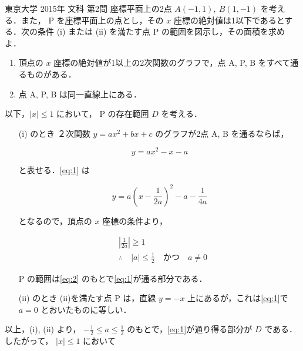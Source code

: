 \documentclass[a4paper]{ltjsarticle}
\begin{document}
\begin{itembox}[l]{東京大学 2015年 文科 第2問}
    座標平面上の2点 $A(-1, 1),\ B(1, -1)$ を考える．また， P を座標平面上の点とし，その $x$ 座標の絶対値は1以下であるとする．次の条件 (i) または (ii) を満たす点 P の範囲を図示し，その面積を求めよ．

    \begin{enumerate}[label=(\roman*)]
        \item 頂点の $x$ 座標の絶対値が1以上の2次関数のグラフで，点 A, P, B をすべて通るものがある．
        \item 点 A, P, B は同一直線上にある．
    \end{enumerate}
\end{itembox}

以下，$|x|\leq 1$ において， P の存在範囲 $D$ を考える．

\begin{itemize}
    \item[(i) のとき] ２次関数 $y=ax^2+bx+c$ のグラフが2点 A, B を通るならば，

        \begin{equation}
            y=ax^2-x-a\label{eq:1}
        \end{equation}

        と表せる．\eqref{eq:1} は

        \begin{equation*}
            y=a(x-\frac{1}{2a})^2-a-\frac{1}{4a}
        \end{equation*}

        となるので，頂点の $x$ 座標の条件より，

        \begin{align}
             & \left|\frac{1}{2a}\right|\geq 1\nonumber                                   \\
             & \therefore\quad |a|\leq \frac{1}{2}\quad\text{かつ}\quad a\neq 0\label{eq:2}
        \end{align}

        P の範囲は\eqref{eq:2} のもとで\eqref{eq:1}が通る部分である．

    \item[(ii) のとき] (ii)を満たす点 P は，直線 $y=-x$ 上にあるが，これは\eqref{eq:1}で $a=0$ とおいたものに等しい．
\end{itemize}

以上，(i), (ii) より， $-\frac{1}{2}\leq a\leq\frac{1}{2}$ のもとで，\eqref{eq:1}が通り得る部分が $D$ である．したがって， $|x|\leq 1$ において
\end{document}

